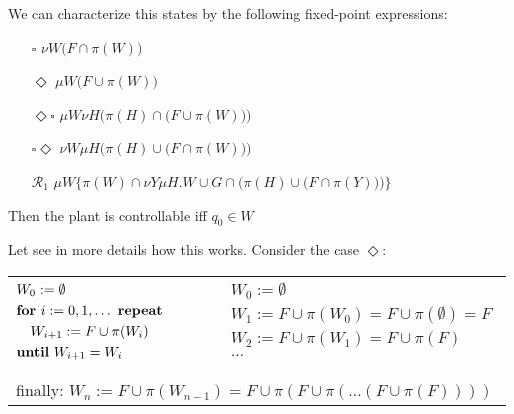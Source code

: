 \documentclass[table]{beamer}
\begin{document}
\begin{frame}
	We can characterize this states by the following fixed-point expressions:
	\begin{itemize}
		\item[$\square$] $\nu W \big( F \cap \pi(W)\big)$ 
		\item[$\Diamond$] $\mu W\big(F \cup \pi(W)\big)$ 
		\item[$\Diamond\square$] $\mu W \nu H\Big(\pi(H) \cap \big(F \cup \pi(W)\big)\Big)$
		\item[$\square\Diamond$] $\nu W \mu H\Big(\pi(H) \cup \big(F \cap \pi(W)\big)\Big)$
		\item[$\mathcal{R}_1$] $\mu W \Bigg\{\pi(W) \cap \nu Y \mu H . W \cup G \cap \Big(\pi(H) \cup \big(F \cap \pi(Y)\big)\Big)\Bigg\}$
	\end{itemize}
	Then the plant is controllable iff $q_0 \in W$
\end{frame}

\begin{frame}
	Let see in more details how this works. Consider the case $\Diamond$:
	\begin{table}[]
		\begin{tabular}{lll}
		$\begin{aligned}
			&W_0 := \emptyset \\
			&\textrm{\textbf{for} } i:=0,1,\ldots \textrm{ \textbf{repeat}} \\
			& \quad W_{i+1} := F \cup \pi(W_i) \\
			&\textrm{\textbf{until} } W_{i+1} = W_i\\
		\end{aligned}$
		& $\quad$ &
		$\begin{aligned}
			&W_0 := \emptyset \\
			&W_1 := F \cup \pi(W_0) = F \cup \pi(\emptyset) = F \\
			&W_2 := F \cup \pi(W_1) = F \cup \pi(F)\\
			& \ldots \\
		\end{aligned}$ \\
		&&\\%
		\multicolumn{3}{l}{finally: $W_n := F \cup \pi(W_{n-1}) = F \cup \pi(F \cup \pi(\ldots(F \cup \pi(F))))$}
		\end{tabular}
	\end{table}
\end{frame}
\end{document}
